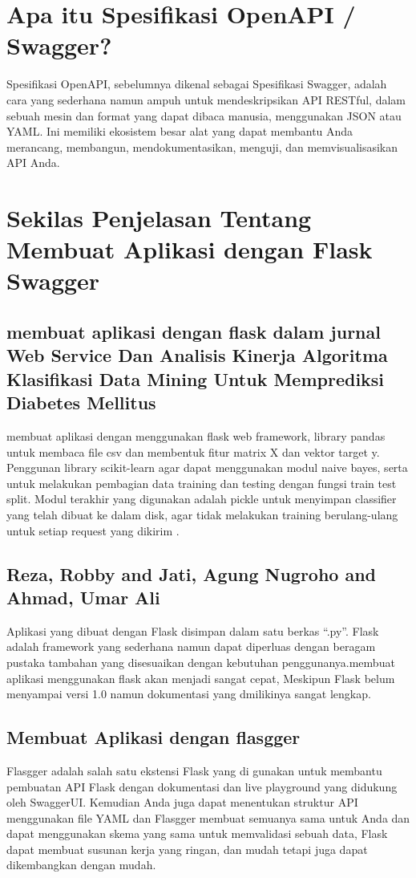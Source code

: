 \documentclass[12pt]{article}
\begin{document}
\section{Apa itu Spesifikasi OpenAPI / Swagger?}
Spesifikasi OpenAPI, sebelumnya dikenal sebagai Spesifikasi Swagger, adalah cara yang sederhana namun ampuh untuk mendeskripsikan API RESTful, dalam sebuah mesin dan format yang dapat dibaca manusia, menggunakan JSON atau YAML. Ini memiliki ekosistem besar alat yang dapat membantu Anda merancang, membangun, mendokumentasikan, menguji, dan memvisualisasikan API Anda.


\section{Sekilas Penjelasan Tentang Membuat Aplikasi dengan Flask Swagger}

\subsection{membuat aplikasi dengan flask dalam jurnal Web Service Dan  Analisis Kinerja Algoritma Klasifikasi Data Mining Untuk Memprediksi Diabetes Mellitus}
membuat aplikasi dengan menggunakan flask web framework, library pandas untuk membaca file csv dan membentuk fitur matrix X dan vektor target y. Penggunan library scikit-learn agar dapat menggunakan modul naive bayes, serta untuk melakukan pembagian data training dan testing dengan fungsi train test split. Modul terakhir yang digunakan adalah pickle untuk menyimpan classifier yang telah dibuat ke dalam disk, agar tidak melakukan training berulang-ulang untuk setiap request yang dikirim \cite{setyawan2017implementasi}. 

\subsection{Reza, Robby and Jati, Agung Nugroho and Ahmad, Umar Ali}
Aplikasi yang dibuat dengan Flask disimpan dalam satu berkas “.py”. Flask adalah framework yang sederhana namun dapat diperluas dengan beragam pustaka tambahan yang disesuaikan dengan kebutuhan penggunanya.membuat aplikasi menggunakan flask akan menjadi sangat cepat, Meskipun Flask belum menyampai versi 1.0 namun dokumentasi yang dmilikinya sangat lengkap\cite{reza2016perancangan}. 

\subsection{Membuat Aplikasi dengan flasgger}
Flasgger adalah salah satu ekstensi Flask yang di gunakan untuk membantu pembuatan API Flask dengan dokumentasi dan live playground yang didukung oleh SwaggerUI. Kemudian Anda juga dapat menentukan struktur API menggunakan file YAML dan Flasgger membuat semuanya sama untuk Anda dan dapat menggunakan skema yang sama untuk memvalidasi sebuah data, Flask dapat membuat susunan kerja yang ringan, dan mudah tetapi juga dapat dikembangkan dengan mudah\cite{gunawan2018aplikasi}.
\end{document}
